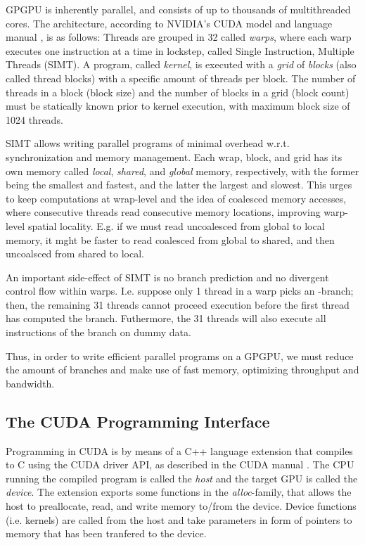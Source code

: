 GPGPU is inherently parallel, and consists of up to thousands of multithreaded
cores. The architecture, according to NVIDIA's CUDA model and language manual
\cite{cudaguide}, is as follows: Threads are grouped in 32 called
\textit{warps}, where each warp executes one instruction at a time in lockstep,
called Single Instruction, Multiple Threads (SIMT). A program, called
\textit{kernel}, is executed with a \textit{grid} of \textit{blocks} (also
called thread blocks) with a specific amount of threads per block. The number of
threads in a block (block size) and the number of blocks in a grid (block count)
must be statically known prior to kernel execution, with maximum block size of
1024 threads.

SIMT allows writing parallel programs of minimal overhead w.r.t. synchronization
and memory management. Each wrap, block, and grid has its own memory called
\textit{local}, \textit{shared}, and \textit{global} memory, respectively, with
the former being the smallest and fastest, and the latter the largest and
slowest. This urges to keep computations at wrap-level and the idea of coalesced
memory accesses, where consecutive threads read consecutive memory locations,
improving warp-level spatial locality. E.g. if we must read uncoalesced from
global to local memory, it mght be faster to read coalesced from global to
shared, and then uncoalsced from shared to local.

An important side-effect of SIMT is no branch prediction and no divergent
control flow within warps. I.e. suppose only 1 thread in a warp picks an
-branch; then, the remaining 31 threads cannot proceed execution before
the first thread has computed the branch. Futhermore, the 31 threads will also
execute all instructions of the branch on dummy data.

Thus, in order to write efficient parallel programs on a GPGPU, we must reduce
the amount of branches and make use of fast memory, optimizing throughput and
bandwidth.

\subsection{The CUDA Programming Interface}
\label{subsec:cuda}

Programming in CUDA is by means of a C++ language extension that compiles to C
using the CUDA driver API, as described in the CUDA manual \cite{cudaguide}. The
CPU running the compiled program is called the \textit{host} and the target GPU
is called the \textit{device}. The extension exports some functions in the
\textit{alloc}-family, that allows the host to preallocate, read, and write
memory to/from the device. Device functions (i.e. kernels) are called from the
host and take parameters in form of pointers to memory that has been tranfered
to the device.

